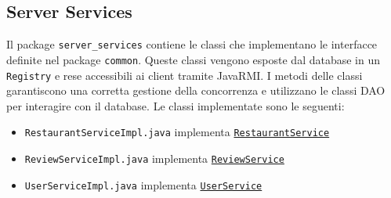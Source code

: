 \subsection{Server Services}
Il package \texttt{server\_services} contiene le classi che implementano
le interfacce definite nel package \texttt{common}.
Queste classi vengono esposte dal database in un \texttt{Registry}
e rese accessibili ai client tramite JavaRMI.
I metodi delle classi garantiscono una corretta gestione della 
concorrenza e utilizzano le classi DAO per interagire con il database.
Le classi implementate sono le seguenti:
\begin{itemize}
    \item \texttt{RestaurantServiceImpl.java} implementa \texttt{\hyperref[sec:restaurantservice]{RestaurantService}}
    \item \texttt{ReviewServiceImpl.java} implementa \texttt{\hyperref[sec:reviewservice]{ReviewService}}
    \item \texttt{UserServiceImpl.java} implementa \texttt{\hyperref[sec:userservice]{UserService}}
\end{itemize}
